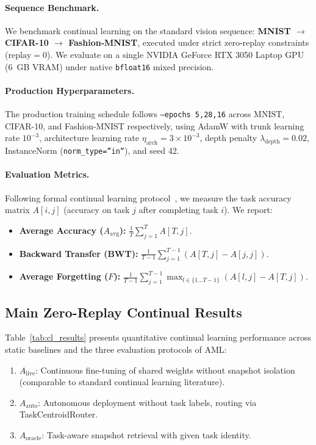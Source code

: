 \documentclass[11pt, a4paper]{article}
\begin{document}
\paragraph{Sequence Benchmark.}
We benchmark continual learning on the standard vision sequence: \textbf{MNIST $\to$ CIFAR-10 $\to$ Fashion-MNIST}, executed under strict zero-replay constraints ($\text{replay}=0$). We evaluate on a single NVIDIA GeForce RTX 3050 Laptop GPU (6~GB VRAM) under native \texttt{bfloat16} mixed precision.

\paragraph{Production Hyperparameters.}
The production training schedule follows \texttt{--epochs 5,28,16} across MNIST, CIFAR-10, and Fashion-MNIST respectively, using AdamW with trunk learning rate $10^{-3}$, architecture learning rate $\eta_{\text{arch}} = 3 \times 10^{-3}$, depth penalty $\lambda_{\text{depth}} = 0.02$, InstanceNorm (\texttt{norm\_type=''in''}), and seed 42.

\paragraph{Evaluation Metrics.}
Following formal continual learning protocol~\cite{diaz2018don}, we measure the task accuracy matrix $A[i, j]$ (accuracy on task $j$ after completing task $i$). We report:
\begin{itemize}
    \item \textbf{Average Accuracy ($A_{\text{avg}}$):} $\frac{1}{T} \sum_{j=1}^T A[T, j]$.
    \item \textbf{Backward Transfer (BWT):} $\frac{1}{T-1} \sum_{j=1}^{T-1} (A[T, j] - A[j, j])$.
    \item \textbf{Average Forgetting ($F$):} $\frac{1}{T-1} \sum_{j=1}^{T-1} \max_{l \in \{1 \dots T-1\}} (A[l, j] - A[T, j])$.
\end{itemize}

\subsection{Main Zero-Replay Continual Results}

Table~\ref{tab:cl_results} presents quantitative continual learning performance across static baselines and the three evaluation protocols of AML:
\begin{enumerate}
    \item $A_{\text{live}}$: Continuous fine-tuning of shared weights without snapshot isolation (comparable to standard continual learning literature).
    \item $A_{\text{auto}}$: Autonomous deployment without task labels, routing via TaskCentroidRouter.
    \item $A_{\text{oracle}}$: Task-aware snapshot retrieval with given task identity.
\end{enumerate}
\end{document}

